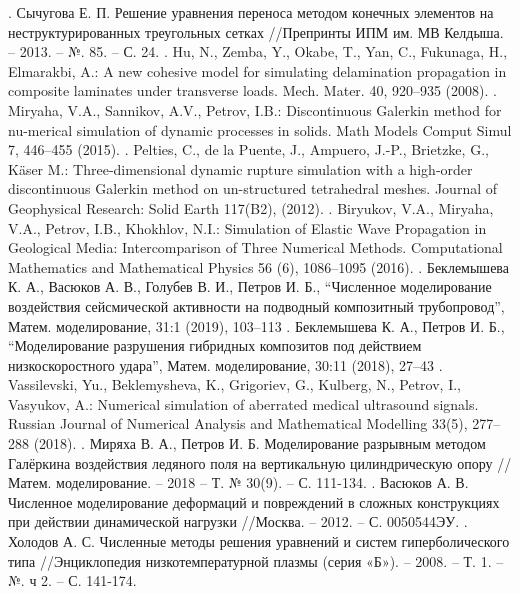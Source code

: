 \documentclass[14pt]{article}
\begin{document}
. \: Сычугова Е. П. Решение уравнения переноса методом конечных элементов на неструктурированных треугольных сетках //Препринты ИПМ им. МВ Келдыша. – 2013. – №. 85. – С. 24.
. \: Hu, N., Zemba, Y., Okabe, T., Yan, C., Fukunaga, H., Elmarakbi, A.: A new cohesive model for simulating delamination propagation in composite laminates under transverse loads. Mech. Mater. 40, 920–935 (2008).
. \: Miryaha, V.A., Sannikov, A.V., Petrov, I.B.: Discontinuous Galerkin method for nu-merical simulation of dynamic processes in solids. Math Models Comput Simul 7, 446–455 (2015).
. \: Pelties, C., de la Puente, J., Ampuero, J.-P., Brietzke, G., Käser M.: Three‐dimensional dynamic rupture simulation with a high‐order discontinuous Galerkin method on un-structured tetrahedral meshes. Journal of Geophysical Research: Solid Earth 117(B2), (2012).
. \: Biryukov, V.A., Miryaha, V.A., Petrov, I.B., Khokhlov, N.I.: Simulation of Elastic Wave Propagation in Geological Media: Intercomparison of Three Numerical Methods. Computational Mathematics and Mathematical Physics 56 (6), 1086–1095 (2016).
. \: Беклемышева К. А.,  Васюков А. В.,  Голубев В. И.,  Петров И. Б., “Численное моделирование воздействия сейсмической активности на подводный композитный трубопровод”, Матем. моделирование, 31:1 (2019),  103–113
. \:  Беклемышева К. А., Петров И. Б., “Моделирование разрушения гибридных композитов под действием низкоскоростного удара”, Матем. моделирование, 30:11 (2018),  27–43
. \: Vassilevski, Yu., Beklemysheva, K., Grigoriev, G., Kulberg, N., Petrov, I., Vasyukov, A.: Numerical simulation of aberrated medical ultrasound signals. Russian Journal of Numerical Analysis and Mathematical Modelling 33(5), 277–288 (2018).
. \: Миряха В. А., Петров И. Б. Моделирование разрывным методом Галёркина воздействия ледяного поля на вертикальную цилиндрическую опору // Матем. моделирование. – 2018 – Т. № 30(9). – С. 111-134.
. \: Васюков А. В. Численное моделирование деформаций и повреждений в сложных конструкциях при действии динамической нагрузки //Москва. – 2012. – С. 0050544ЭУ.
. \: Холодов А. С. Численные методы решения уравнений и систем гиперболического типа //Энциклопедия низкотемпературной плазмы (серия «Б»). – 2008. – Т. 1. – №. ч 2. – С. 141-174.
\end{document}
